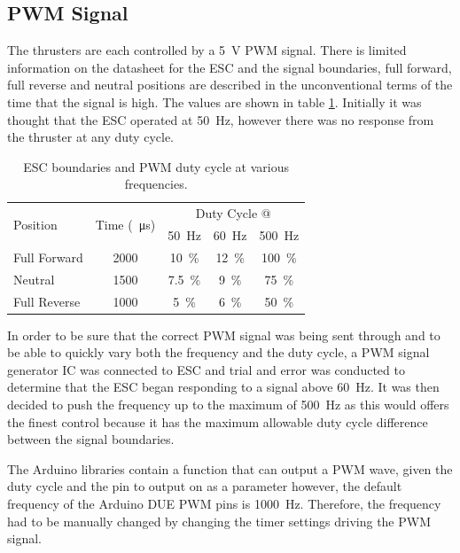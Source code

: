 \subsection{PWM Signal}
The thrusters are each controlled by a \SI{5}{\volt} PWM signal. There is limited information on the datasheet for the ESC and the signal boundaries, full forward, full reverse and neutral positions are described in the unconventional terms of the time that the signal is high. The values are shown in table \ref{tab:3:PWM}. Initially it was thought that the ESC operated at \SI{50}{\hertz}, however there was no response from the thruster at any duty cycle.\par
\begin{table}[!ht]
\begin{center}
\caption{ESC boundaries and PWM duty cycle at various frequencies.}
\label{tab:3:PWM}
\begin{tabular}{|l|c|c|c|c|}
\hline
\multirow{2}{*}{Position} & \multirow{2}{*}{Time (\SI{}{\micro\second})} & \multicolumn{3}{c|}{Duty Cycle @}\\
& & \multicolumn{1}{c}{\SI{50}{\hertz}} & \multicolumn{1}{c}{\SI{60}{\hertz}} & \multicolumn{1}{c|}{\SI{500}{\hertz}}\\
\hline
Full Forward & 2000 & \SI{10}{\percent} & \SI{12}{\percent} & \SI{100}{\percent}  \\
\hline
Neutral & 1500 & \SI{7.5}{\percent} & \SI{9}{\percent} & \SI{75}{\percent}  \\
\hline
Full Reverse & 1000 & \SI{5}{\percent} & \SI{6}{\percent} & \SI{50}{\percent}  \\
\hline
\end{tabular}
\end{center}
\end{table}
\vspace{0.4cm}
In order to be sure that the correct PWM signal was being sent through and to be able to quickly vary both the frequency and the duty cycle, a PWM signal generator IC was connected to ESC and trial and error was conducted to determine that the ESC began responding to a signal above \SI{60}{\hertz}. It was then decided to push the frequency up to the maximum of \SI{500}{\hertz} as this would offers the finest control because it has the maximum allowable duty cycle difference between the signal boundaries.\par
\vspace{0.4cm}
The Arduino libraries contain a function that can output a PWM wave, given the duty cycle and the pin to output on as a parameter however, the default frequency of the Arduino DUE PWM pins is \SI{1000}{\hertz}. Therefore, the frequency had to be manually changed by changing the timer settings driving the PWM signal.\par
